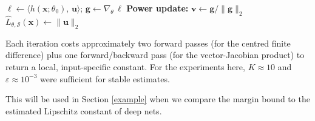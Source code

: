 \documentclass{article}
\theoremstyle{plain}
\theoremstyle{definition}
\theoremstyle{remark}
\begin{document}
\begin{algorithm}[H]
\begin{algorithmic}[1]
    $\ell \gets \langle h(\mathbf{x};\theta_0),\,\mathbf{u}\rangle$; \quad $\mathbf{g} \gets \nabla_{\theta}\,\ell$ 
    \State \textbf{Power update:} $\mathbf{v} \gets \mathbf{g}/\|\mathbf{g}\|_2$  
\EndFor
\State \Return $\widehat{L}_{\theta,\mathcal S}(\mathbf{x}) \gets \|\mathbf{u}\|_2$
\end{algorithmic}
\end{algorithm}

Each iteration costs approximately two forward passes (for the centred finite difference)
plus one forward/backward pass (for the vector-Jacobian product) to return a local, input-specific constant. For the experiments here, $K\approx 10$ and $\varepsilon\approx 10^{-3}$
were sufficient for stable estimates. 

This will be used in Section \ref{example} when we compare the margin bound to the estimated Lipschitz constant of deep nets.




\end{document}
